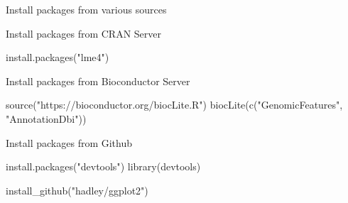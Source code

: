 \documentclass[
  10pt,
  ignorenonframetext,
]{beamer}
\newenvironment{Shaded}{\begin{snugshade}}{\end{snugshade}}
\newcommand{\KeywordTok}[1]{\textcolor[rgb]{0.94,0.87,0.69}{#1}}
\newcommand{\NormalTok}[1]{\textcolor[rgb]{0.80,0.80,0.80}{#1}}
\newcommand{\StringTok}[1]{\textcolor[rgb]{0.80,0.58,0.58}{#1}}
\begin{document}
\begin{frame}[fragile]{Install packages from various sources}
\protect\hypertarget{install-packages-from-various-sources}{}

\begin{block}{Install packages from CRAN Server}

\begin{Shaded}
\begin{Highlighting}[]
\KeywordTok{install.packages}\NormalTok{(}\StringTok{"lme4"}\NormalTok{)}
\end{Highlighting}
\end{Shaded}

\end{block}

\begin{block}{Install packages from Bioconductor Server}

\begin{Shaded}
\begin{Highlighting}[]
\KeywordTok{source}\NormalTok{(}\StringTok{"https://bioconductor.org/biocLite.R"}\NormalTok{)}
\KeywordTok{biocLite}\NormalTok{(}\KeywordTok{c}\NormalTok{(}\StringTok{"GenomicFeatures"}\NormalTok{, }\StringTok{"AnnotationDbi"}\NormalTok{))}
\end{Highlighting}
\end{Shaded}

\end{block}

\begin{block}{Install packages from Github}

\begin{Shaded}
\begin{Highlighting}[]
\KeywordTok{install.packages}\NormalTok{(}\StringTok{"devtools"}\NormalTok{)}
\KeywordTok{library}\NormalTok{(devtools)}

\KeywordTok{install_github}\NormalTok{(}\StringTok{"hadley/ggplot2"}\NormalTok{)}
\end{Highlighting}
\end{Shaded}

\end{block}

\end{frame}
\end{document}
